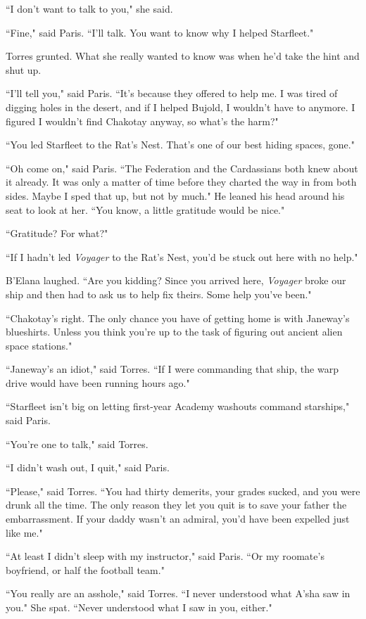 \documentclass[twoside,letterpaper,12pt]{memoir}
\begin{document}
``I don't want to talk to you," she said.

``Fine," said Paris. ``I'll talk. You want to know why I helped Starfleet."

Torres grunted. What she really wanted to know was when he'd take the hint and shut up.

``I'll tell you," said Paris. ``It's because they offered to help me. I was tired of digging holes in the desert, and if I helped Bujold, I wouldn't have to anymore. I figured I wouldn't find Chakotay anyway, so what's the harm?"

``You led Starfleet to the Rat's Nest. That's one of our best hiding spaces, gone."

``Oh come on," said Paris. ``The Federation and the Cardassians both knew about it already. It was only a matter of time before they charted the way in from both sides. Maybe I sped that up, but not by much." He leaned his head around his seat to look at her. ``You know, a little gratitude would be nice."

``Gratitude? For what?"

``If I hadn't led \textit{Voyager} to the Rat's Nest, you'd be stuck out here with no help."

B'Elana laughed. ``Are you kidding? Since you arrived here, \textit{Voyager} broke our ship and then had to ask us to help fix theirs. Some help you've been."

``Chakotay's right. The only chance you have of getting home is with Janeway's blueshirts. Unless you think you're up to the task of figuring out ancient alien space stations."

``Janeway's an idiot," said Torres. ``If I were commanding that ship, the warp drive would have been running hours ago."

``Starfleet isn't big on letting first-year Academy washouts command starships," said Paris.

``You're one to talk," said Torres.

``I didn't wash out, I quit," said Paris.

``Please," said Torres. ``You had thirty demerits, your grades sucked, and you were drunk all the time. The only reason they let you quit is to save your father the embarrassment. If your daddy wasn't an admiral, you'd have been expelled just like me."

``At least I didn't sleep with my instructor," said Paris. ``Or my roomate’s boyfriend, or half the football team."

``You really are an asshole," said Torres. ``I never understood what A'sha saw in you." She spat. ``Never understood what I saw in you, either."
\end{document}
